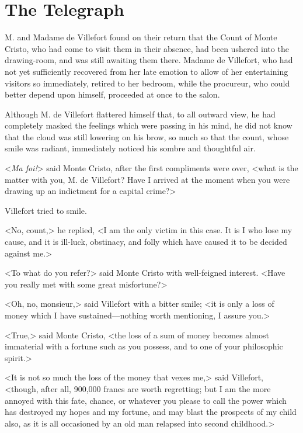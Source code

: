 \chapter{The Telegraph} 
	
\lettrine{M}{.} and Madame de Villefort found on their return that the Count of Monte Cristo, who had come to visit them in their absence, had been ushered into the drawing-room, and was still awaiting them there. Madame de Villefort, who had not yet sufficiently recovered from her late emotion to allow of her entertaining visitors so immediately, retired to her bedroom, while the procureur, who could better depend upon himself, proceeded at once to the salon. 

 Although M. de Villefort flattered himself that, to all outward view, he had completely masked the feelings which were passing in his mind, he did not know that the cloud was still lowering on his brow, so much so that the count, whose smile was radiant, immediately noticed his sombre and thoughtful air. 

 <\textit{Ma foi!}> said Monte Cristo, after the first compliments were over, <what is the matter with you, M. de Villefort? Have I arrived at the moment when you were drawing up an indictment for a capital crime?> 

 Villefort tried to smile. 

 <No, count,> he replied, <I am the only victim in this case. It is I who lose my cause, and it is ill-luck, obstinacy, and folly which have caused it to be decided against me.> 

 <To what do you refer?> said Monte Cristo with well-feigned interest. <Have you really met with some great misfortune?> 

 <Oh, no, monsieur,> said Villefort with a bitter smile; <it is only a loss of money which I have sustained—nothing worth mentioning, I assure you.> 

 <True,> said Monte Cristo, <the loss of a sum of money becomes almost immaterial with a fortune such as you possess, and to one of your philosophic spirit.> 

 <It is not so much the loss of the money that vexes me,> said Villefort, <though, after all, 900,000 francs are worth regretting; but I am the more annoyed with this fate, chance, or whatever you please to call the power which has destroyed my hopes and my fortune, and may blast the prospects of my child also, as it is all occasioned by an old man relapsed into second childhood.>

